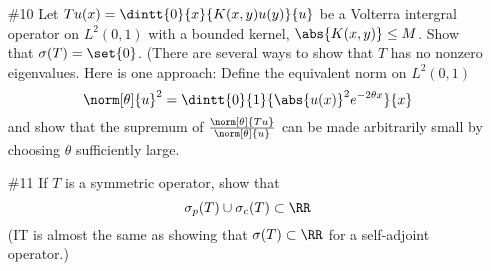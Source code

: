 \documentclass[11pt, oneside]{article}
\begin{document}
\begin{enumerate}
\begin{enumerate}
        \begin{proof}
          
        \end{proof}

      \item[(iii)]
        Show that $\sigma(T_3) = \sigma_r(T_3) = \CC$.

        \begin{proof}
          
        \end{proof}
    \end{enumerate}

  \pagebreak
  \item[\#10]
    Let $Tu(x) = \dintt{0}{x}{K(x, y)u(y)}{u}$ be a Volterra intergral operator
    on $L^2(0, 1)$ with a bounded kernel, $\abs{K(x, y)} \le M$.
    Show that $\sigma(T) = \set{0}$.
    (There are several ways to show that $T$ has no nonzero eigenvalues.
    Here is one approach: Define the equivalent norm on $L^2(0, 1)$
    \[
      \norm[\theta]{u}^2 = \dintt{0}{1}{\abs{u(x)}^2e^{-2\theta x}}{x}
    \]
    and show that the supremum of $\frac{\norm[\theta]{Tu}}{\norm[\theta]{u}}$
    can be made arbitrarily small by choosing $\theta$ sufficiently large.

  \pagebreak
  \item[\#11]
    If $T$ is a symmetric operator, show that
    \[
      \sigma_p(T) \cup \sigma_c(T) \subset \RR
    \]
    (IT is almost the same as showing that $\sigma(T) \subset \RR$ for a
    self-adjoint operator.)
\end{enumerate}
\end{document}
